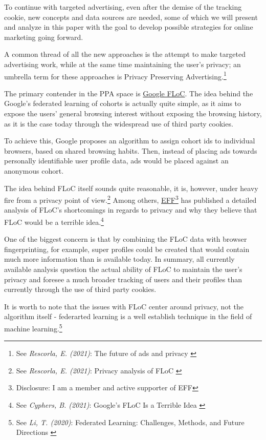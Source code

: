To continue with targeted advertising, even after the demise of the tracking cookie, new concepts and data sources are needed, some of which we will present and analyze in this paper with the goal to develop possible strategies for online marketing going forward.

A common thread of all the new approaches is the attempt to make targeted advertising work, while at the same time maintaining the user's privacy; an umbrella term for these approaches is Privacy Preserving Advertising.\footnote{See \textit{Rescorla, E. (2021)}: The future of ads and privacy \cite{futureAds}}

The primary contender in the PPA space is \href{https://wicg.github.io/floc/}{Google FLoC}. The idea behind the Google's federated learning of cohorts is actually quite simple, as it aims to expose the users' general browsing interest without exposing the browsing history, as it is the case today through the widespread use of third party cookies.

To achieve this, Google proposes an algorithm to assign cohort ids to individual browsers, based on shared browsing habits. Then, instead of placing ads towards personally identifiable user profile data, ads would be placed against an anonymous cohort. 

The idea behind FLoC itself sounds quite reasonable, it is, however, under heavy fire from a privacy point of view.\footnote{See \textit{Rescorla, E. (2021)}: Privacy analysis of FLoC \cite{privacyFloc}} Among others, \href{https://www.eff.org/}{EFF}\footnote{Disclosure: I am a member and active supporter of EFF} has published a detailed analysis of FLoC's shortcomings in regards to privacy and why they believe that FLoC would be a terrible idea.\footnote{See \textit{Cyphers, B. (2021)}: Google’s FLoC Is a Terrible Idea \cite{terribleIdea}}

One of the biggest concern is that by combining the FLoC data with browser fingerprinting, for example, super profiles could be created that would contain much more information than is available today. In summary, all currently available analysis question the actual ability of FLoC to maintain the user's privacy and foresee a much broader tracking of users and their profiles than currently through the use of third party cookies.

It is worth to note that the issues with FLoC center around privacy, not the algorithm itself - federarted learning is a well establish technique in the field of machine learning.\footnote{See \textit{Li, T. (2020)}: Federated Learning: Challenges, Methods, and Future Directions \cite{9084352}}

